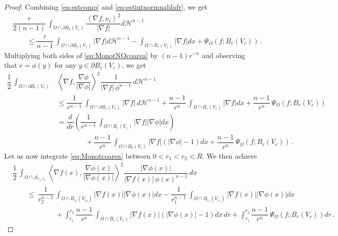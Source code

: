 \documentclass[a4paper,reqno,11pt]{amsart}
\newcommand{\Hau}{{\mathcal H}} %
\newcommand{\de}{\partial}
\newcommand{\cA}{\mathcal{A}}
\begin{document}
\begin{proof}
		Combining \eqref{eq:estcomp} and \eqref{eq:estintnormnablafr}, we get
		\begin{align} \label{eq:MonotNOcoarea}
			& \dfrac{r}{2(n-1)} \, \int_{\Omega \cap \de B_{r}(V_r)} \dfrac{\left \langle \nabla f , \nu_r \right \rangle^{2}}{|\nabla f|} d \Hau^{n-1}\\
			& \qquad \leq \dfrac{r}{n-1} \, \int_{\Omega \cap \de B_{r}(V_r)} |\nabla f| d \Hau^{n-1} - \int_{\Omega \cap B_{r}(V_r)} |\nabla f| dx + \Psi_{\Omega}(f;B_{r}(V_r)) \, . \nonumber
		\end{align}
		Multiplying both sides of \eqref{eq:MonotNOcoarea} by $(n-1) r^{-n}$ and observing that $r = \phi(y)$ for any $y \in \de B_{r}(V_r)$, we get
\begin{align} \label{eq:Monotcoarea}
\dfrac{1}{2} \, \int_{\Omega \cap \de B_{r}(V_r)}& \left \langle \nabla f , \dfrac{\nabla \phi}{|\nabla \phi|} \right \rangle^{2} \dfrac{1}{|\nabla f | \, \phi^{n-1}} \, d \Hau^{n-1} \nonumber \\
			& \leq \dfrac{1}{r^{n-1}} \, \int_{\Omega \cap \de B_{r}(V_r)} |\nabla f | \, d \Hau^{n-1} + \dfrac{n-1}{r^{n}} \, \int_{\Omega \cap B_{r}(V_r)} |\nabla f| dx + \dfrac{n-1}{r^{n}} \, \Psi_{\Omega}(f;B_{r}(V_r)) \nonumber \\
			&= \dfrac{d}{dr} \left( \dfrac{1}{r^{n-1}} \, \int_{\Omega \cap B_{r}(V_r)} |\nabla f||\nabla \phi| dx \right) \\
			& \qquad\qquad + \dfrac{n-1}{r^{n}} \, \int_{\Omega \cap B_{r}(V_r)} |\nabla f |(|\nabla \phi| - 1) dx + \dfrac{n-1}{r^{n}} \, \Psi_{\Omega}(f;B_{r}(V_r)) \, . \nonumber
		\end{align}
		Let us now integrate \eqref{eq:Monotcoarea} between $0 < r_{1} < r_{2} < R$. We then achieve
		\begin{align} \label{eq:intMonotcoarea}
			& \dfrac{1}{2} \, \int_{\Omega \cap \cA_{r_{1},r_{2}}} \left \langle \nabla f(x) , \dfrac{\nabla \phi(x)}{|\nabla \phi(x)|} \right \rangle^{2} \dfrac{|\nabla \phi(x)|}{|\nabla f (x)| \, \phi(x)^{n-1}} \, dx \nonumber \\
			& \qquad \leq\ \dfrac{1}{r_{2}^{n-1}} \, \int_{\Omega \cap B_{r_{2}}(V_{r_2})} |\nabla f (x)||\nabla \phi(x)| dx - \dfrac{1}{r_{1}^{n-1}} \, \int_{\Omega \cap B_{r_{1}}(V_{r_1})} |\nabla f (x)||\nabla \phi(x)| dx \\
			&\qquad \qquad\qquad +\int_{r_{1}}^{r_{2}} \dfrac{n-1}{r^{n}} \, \int_{\Omega \cap B_{r}(V_r)} |\nabla f (x)|(|\nabla \phi(x)| - 1) dx \, dr + \int_{r_{1}}^{r_{2}} \dfrac{n-1}{r^{n}} \, \Psi_{\Omega}(f;B_{r}(V_r)) dr \, . \nonumber

\end{align}
\end{proof}
\end{document}

